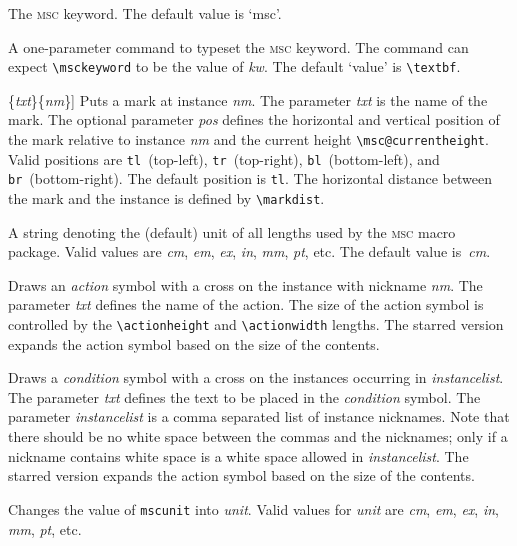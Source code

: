 \documentclass[a4paper]{article}
\newcommand{\cmd}[1]{\texttt{\bslash #1}}
\newcommand{\acro}[1]{{\scshape\lowercase{#1}}}
\newcommand\MSC{\acro{MSC}}
\newcommand{\mscpack}{\MSC{} macro package}
\newcommand{\opt}[1]{[#1]}
\newenvironment{defs}{%
  \begin{list}{}%
              {\setlength{\labelwidth}{0pt}%
               \setlength{\labelsep}{1em}%
               \setlength{\leftmargin}{1em}%
               \setlength{\parsep}{1ex}%
               \setlength{\listparindent}{0pt}%
               \setlength{\rightmargin}{0pt}%
               \renewcommand{\makelabel}[1]{##1}%
               \raggedright%
              }%
  }{%
  \end{list}}
\begin{document}
\begin{defs}
\item[\cmd{msckeyword}] The \MSC{} keyword. The default value is `msc'.

\item[\cmd{msckeywordstyle}\{\emph{kw}\}] A one-parameter command to
typeset the \MSC{} keyword. The command can expect \verb|\msckeyword| to
be the value of \emph{kw}. The default `value' is \verb|\textbf|.

\item[\cmd{mscmark}\opt{\emph{pos}}\{\emph{txt}\}\{\emph{nm}\}] Puts a
mark at instance \emph{nm}. The parameter \emph{txt} is the name of
the mark. The optional parameter \emph{pos} defines the horizontal and
vertical position of the mark relative to instance \emph{nm} and the
current height \verb|\msc@currentheight|. Valid positions are
\verb|tl|~(top-left), \verb|tr|~(top-right), \verb|bl|~(bottom-left),
and \verb|br|~(bottom-right). The default position is \verb|tl|. The
horizontal distance between the mark and the instance is defined by
\verb+\markdist+.

\item[\cmd{mscunit}] A string denoting the (default) unit of all
lengths used by the \mscpack. Valid values are \emph{cm},
\emph{em}, \emph{ex}, \emph{in}, \emph{mm}, \emph{pt}, etc. The
default value is~\emph{cm}.

\item[\cmd{naction(*)}\{\emph{txt}\}\{\emph{nm}\}] Draws an \emph{action}
symbol with a cross on the instance with nickname \emph{nm}. The
parameter \emph{txt} defines the name of the action. The size of the
action symbol is controlled by the \verb|\actionheight| and
\verb|\actionwidth| lengths. The starred version expands the action
symbol based on the size of the contents.

\item[\cmd{ncondition(*)}\{\emph{txt}\}\{\emph{instancelist}\}] Draws a
\emph{condition} symbol with a cross on the instances occurring in
\emph{instancelist}. The parameter \emph{txt} defines the text to be
placed in the \emph{condition} symbol. The parameter
\emph{instancelist} is a comma separated list of instance
nicknames. Note that there should be no white space between the commas
and the nicknames; only if a nickname contains white space is a white
space allowed in \emph{instancelist}. The starred version expands the
action symbol based on the size of the contents.  

\item[\cmd{setmscunit}\{\emph{unit}\}] Changes the value of
\cmd{mscunit} into \emph{unit}. Valid values for \emph{unit} are
\emph{cm}, \emph{em}, \emph{ex}, \emph{in}, \emph{mm}, \emph{pt}, etc.


\end{defs}
\end{document}
